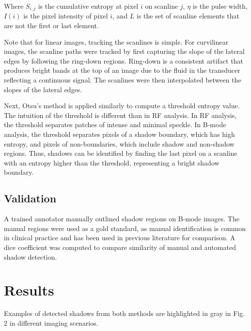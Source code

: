 \documentclass[preprint,5p]{elsarticle}
\begin{document}
Where $S_{i,j}$ is the cumulative entropy at pixel $i$ on scanline $j$, $\eta$ is the pulse width, $I(i)$ is the pixel intensity of pixel $i$, and $L$ is the set of scanline elements that are not the first or last element.

Note that for linear images, tracking the scanlines is simple. For curvilinear images, the scanline paths were tracked by first capturing the slope of the lateral edges by following the ring-down regions. Ring-down is a consistent artifact that produces bright bands at the top of an image due to the fluid in the transducer reflecting a continuous signal. The scanlines were then interpolated between the slopes of the lateral edges.

Next, Otsu's method is applied similarly to compute a threshold entropy value. The intuition of the threshold is different than in RF analysis. In RF analysis, the threshold separates patches of intense and minimal speckle. In B-mode analysis, the threshold separates pixels of a shadow boundary, which has high entropy, and pixels of non-boundaries, which include shadow and non-shadow regions. Thus, shadows can be identified by finding the last pixel on a scanline with an entropy higher than the threshold, representing a bright shadow boundary.



\subsection*{Validation}

A trained annotator manually outlined shadow regions on B-mode images. The manual regions were used as a gold standard, as manual identification is common in clinical practice and has been used in previous literature for comparison. A dice coefficient was computed to compare similarity of manual and automated shadow detection.

\section*{Results}
\label{Results}

Examples of detected shadows from both methods are highlighted in gray in Fig. 2 in different imaging scenarios.
\end{document}
